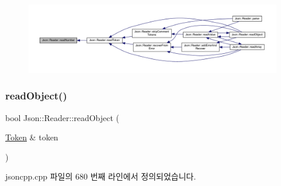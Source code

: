 \begin{figure}[H]
\begin{center}
\leavevmode
\includegraphics[width=350pt]{class_json_1_1_reader_afb31bfda6bb27d6453057a47655e8363_icgraph}
\end{center}
\end{figure}
\mbox{\label{class_json_1_1_reader_a0068eb3d8e86e91f0e4806f60da66b9c}} 
\subsubsection{\texorpdfstring{read\+Object()}{readObject()}}
{\footnotesize\ttfamily bool Json\+::\+Reader\+::read\+Object (\begin{DoxyParamCaption}\item[{\hyperlink{class_json_1_1_reader_1_1_token}{Token} \&}]{token }\end{DoxyParamCaption})\hspace{0.3cm}{\ttfamily [private]}}



jsoncpp.\+cpp 파일의 680 번째 라인에서 정의되었습니다.


